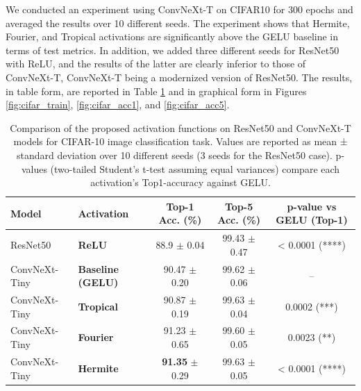 \documentclass{article} %
\theoremstyle{plain}
\theoremstyle{definition}
\theoremstyle{remark}
\begin{document}
We conducted an experiment using ConvNeXt-T on CIFAR10 for 300 epochs and averaged the results over 10 different seeds. The experiment shows that Hermite, Fourier, and Tropical activations are significantly above the GELU baseline in terms of test metrics. In addition, we added three different seeds for ResNet50 with ReLU, and the results of the latter are clearly inferior to those of ConvNeXt-T, ConvNeXt-T being a modernized version of ResNet50. The results, in table form, are reported in Table \ref{res:cifar_pretrain} and in graphical form in Figures \ref{fig:cifar_train}, \ref{fig:cifar_acc1}, and \ref{fig:cifar_acc5}.
\begin{table}[!htbp]
\caption{Comparison of the proposed activation functions on ResNet50 and ConvNeXt-T models for CIFAR-10 image classification task. Values are reported as mean ± standard deviation over 10 different seeds (3 seeds for the ResNet50 case). p-values (two-tailed Student’s t-test assuming equal variances) compare each activation’s Top1-accuracy against GELU.}
\label{res:cifar_pretrain}
\vskip 0.15in
\begin{center}
\begin{small}
\begin{tabular}{l l c c c}
\toprule
\textbf{Model} & \textbf{Activation} & \textbf{Top-1 Acc. (\%)} & \textbf{Top-5 Acc. (\%)} & \textbf{p-value vs GELU (Top-1)} \\
\midrule
ResNet50 & \textbf{ReLU} & 88.9 $\pm$ 0.04 & 99.43 $\pm$ 0.47 & < 0.0001  (****) \\
ConvNeXt-Tiny & \textbf{Baseline (GELU)} & 90.47 $\pm$ 0.20 & 99.62 $\pm$ 0.06 & -- \\
ConvNeXt-Tiny & \textbf{Tropical} & 90.87 $\pm$ 0.19 & 99.63 $\pm$ 0.04 & 0.0002  (***) \\
ConvNeXt-Tiny & \textbf{Fourier} & 91.23 $\pm$ 0.65 & 99.60 $\pm$ 0.05 & 0.0023 (**)  \\
ConvNeXt-Tiny & \textbf{Hermite} & \textbf{91.35} $\pm$ 0.29 & 99.63 $\pm$ 0.05 & < 0.0001  (****) \\
\bottomrule
\end{tabular}
\end{small}
\end{center}
\vskip -0.1in
\end{table}
\label{appendix:cifar10}
\end{document}
